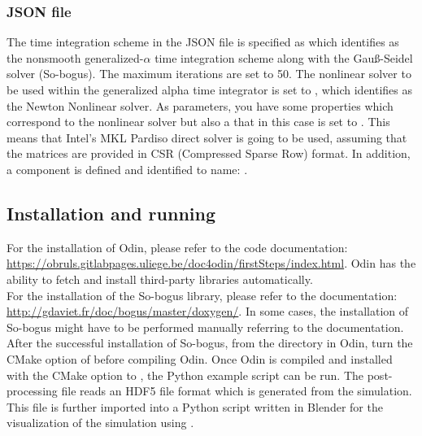 \subsubsection{JSON file}
The time integration scheme in the JSON file is specified as  which identifies as the nonsmooth generalized-$\alpha$ time integration scheme along with the Gau{\ss}-Seidel solver (So-bogus). The maximum iterations are set to 50. The nonlinear solver to be used within the generalized alpha time integrator is set to , which identifies as the Newton Nonlinear solver. As parameters, you have some properties which correspond to the nonlinear solver but also a  that in this case is set to . This means that Intel's MKL Pardiso direct solver is going to be used, assuming that the matrices are provided in CSR (Compressed Sparse Row) format. In addition, a component  is defined and identified to name: .

\subsection{Installation and running}
For the installation of Odin, please refer to the code documentation: \url{https://obruls.gitlabpages.uliege.be/doc4odin/firstSteps/index.html}. Odin has the ability to fetch and install third-party libraries automatically.\\

For the installation of the So-bogus library, please refer to the documentation: \url{http://gdaviet.fr/doc/bogus/master/doxygen/}. In some cases, the installation of So-bogus might have to be performed manually referring to the documentation. After the successful installation of So-bogus, from the  directory in Odin, turn  the CMake option of  before compiling Odin. Once Odin is compiled and installed with the CMake option  to , the Python example script can be run. The post-processing file reads an HDF5 file format which is generated from the simulation. This  file is further imported into a Python script written in Blender for the visualization of the simulation using .

